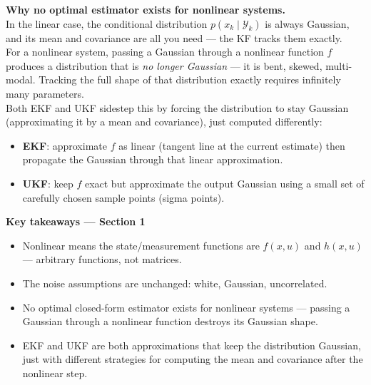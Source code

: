 \documentclass[12pt, a4paper]{article}
\begin{document}
\begin{warnbox}
  \textbf{Why no optimal estimator exists for nonlinear systems.}\\
  In the linear case, the conditional distribution $p(x_k \mid
  \mathcal{Y}_k)$ is always Gaussian, and its mean and covariance
  are all you need --- the KF tracks them exactly.\\[4pt]
  For a nonlinear system, passing a Gaussian through a nonlinear
  function $f$ produces a distribution that is \emph{no longer
  Gaussian} --- it is bent, skewed, multi-modal.
  Tracking the full shape of that distribution exactly requires
  infinitely many parameters.\\[4pt]
  Both EKF and UKF sidestep this by forcing the distribution to
  stay Gaussian (approximating it by a mean and covariance), just
  computed differently:
  \begin{itemize}[leftmargin=1.4em, topsep=2pt]
    \item \textbf{EKF}: approximate $f$ as linear (tangent line at
          the current estimate) then propagate the Gaussian through
          that linear approximation.
    \item \textbf{UKF}: keep $f$ exact but approximate the output
          Gaussian using a small set of carefully chosen sample
          points (sigma points).
  \end{itemize}
\end{warnbox}

\begin{keybox}
  \textbf{Key takeaways --- Section 1}
  \begin{itemize}[leftmargin=1.4em, topsep=2pt]
    \item Nonlinear means the state/measurement functions are
          $f(x,u)$ and $h(x,u)$ --- arbitrary functions, not
          matrices.
    \item The noise assumptions are unchanged: white, Gaussian,
          uncorrelated.
    \item No optimal closed-form estimator exists for nonlinear
          systems --- passing a Gaussian through a nonlinear
          function destroys its Gaussian shape.
    \item EKF and UKF are both approximations that keep the
          distribution Gaussian, just with different strategies
          for computing the mean and covariance after the
          nonlinear step.
  \end{itemize}
\end{keybox}
\end{document}
